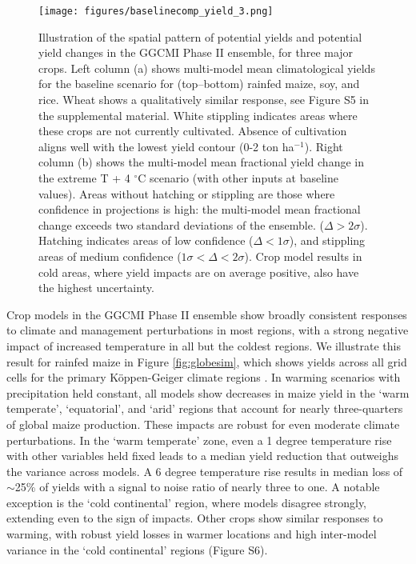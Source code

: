 \documentclass[esd, manuscript]{copernicus} %
\begin{document}
\begin{figure}[ht]
\centering
   \texttt{[image: figures/baselinecomp\_yield\_3.png]} 
   \caption{Illustration of the spatial pattern of potential yields and potential yield changes in the GGCMI Phase II ensemble, for three major crops. Left column (a) shows multi-model mean climatological yields for the baseline scenario for (top--bottom) rainfed maize, soy, and rice. Wheat shows a qualitatively similar response, see Figure S5 in the supplemental material. White stippling indicates areas where these crops are not currently cultivated. Absence of cultivation aligns well with the lowest yield contour (0-2 ton ha$^{-1}$). Right column (b) shows the multi-model mean fractional yield change in the extreme T + 4 $^{\circ}$C scenario (with other inputs at baseline values). Areas without hatching or stippling are those where confidence in projections is high: the multi-model mean fractional change exceeds two standard deviations of the ensemble. ($\Delta > 2\sigma$). Hatching indicates areas of low confidence ($\Delta < 1 \sigma$), and stippling areas of medium confidence ($1 \sigma < \Delta < 2 \sigma$). Crop model results in cold areas, where yield impacts are on average positive, also have the highest uncertainty.}
   \label{fig:maizesoybaseline}
\end{figure}


Crop models in the GGCMI Phase II ensemble show broadly consistent responses to climate and management perturbations in most regions, with a strong negative impact of increased temperature in all but the coldest regions. We illustrate this result for rainfed maize in Figure \ref{fig:globesim}, which shows yields across all grid cells for the primary K\"{o}ppen-Geiger climate regions \citep{rubel2010}. In warming scenarios with precipitation held constant, all models show decreases in maize yield in the `warm temperate', `equatorial', and `arid' regions that account for nearly three-quarters of global maize production. These impacts are robust for even moderate climate perturbations. In the `warm temperate' zone, even a 1 degree temperature rise with other variables held fixed leads to a median yield reduction that outweighs the variance across models. A 6 degree temperature rise results in median loss of $\sim$25\% of yields with a signal to noise ratio of nearly three to one. A notable exception is the `cold continental' region, where models disagree strongly, extending even to the sign of impacts. Other crops show similar responses to warming, with robust yield losses in warmer locations and high inter-model variance in the `cold continental' regions (Figure S6).
\end{document}
